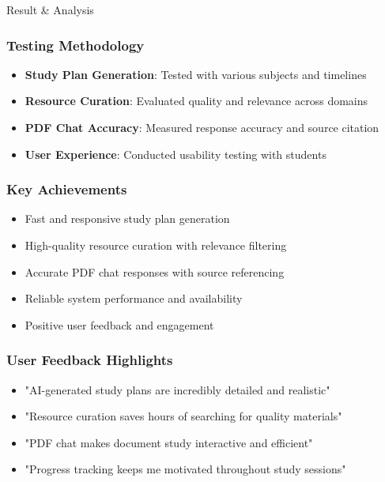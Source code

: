\documentclass{beamer}
\begin{document}
\begin{frame}{Result \& Analysis}
\frametitle{Testing Methodology}
\begin{itemize}
\item \textbf{Study Plan Generation}: Tested with various subjects and timelines
\item \textbf{Resource Curation}: Evaluated quality and relevance across domains
\item \textbf{PDF Chat Accuracy}: Measured response accuracy and source citation
\item \textbf{User Experience}: Conducted usability testing with students
\end{itemize}

\vspace{0.5cm}
\frametitle{Key Achievements}
\begin{itemize}
\item Fast and responsive study plan generation
\item High-quality resource curation with relevance filtering
\item Accurate PDF chat responses with source referencing
\item Reliable system performance and availability
\item Positive user feedback and engagement
\end{itemize}

\vspace{0.3cm}
\frametitle{User Feedback Highlights}
\begin{itemize}
\item "AI-generated study plans are incredibly detailed and realistic"
\item "Resource curation saves hours of searching for quality materials"
\item "PDF chat makes document study interactive and efficient"
\item "Progress tracking keeps me motivated throughout study sessions"
\end{itemize}
\end{frame}
\end{document}
